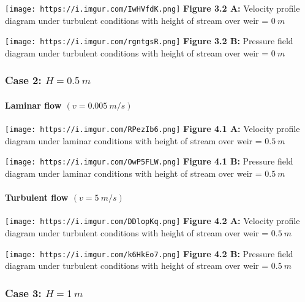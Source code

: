 \documentclass[11pt]{article}
\begin{document}
\texttt{[image: https://i.imgur.com/IwHVfdK.png]} \textbf{Figure 3.2 A:}
Velocity profile diagram under turbulent conditions with height of
stream over weir = \(0\ m\)

\texttt{[image: https://i.imgur.com/rgntgsR.png]} \textbf{Figure 3.2 B:}
Pressure field diagram under turbulent conditions with height of stream
over weir = \(0\ m\)

\hypertarget{case-2-h-0.5-m-1}{%
\subsubsection{\texorpdfstring{Case 2:
\(H = 0.5\ m\)}{Case 2: H = 0.5\textbackslash{} m}}\label{case-2-h-0.5-m-1}}

\hypertarget{laminar-flow-v-0.005-ms-1}{%
\paragraph{\texorpdfstring{Laminar flow
\((v = 0.005\ m/s)\)}{Laminar flow (v = 0.005\textbackslash{} m/s)}}\label{laminar-flow-v-0.005-ms-1}}

\texttt{[image: https://i.imgur.com/RPezIb6.png]} \textbf{Figure 4.1 A:}
Velocity profile diagram under laminar conditions with height of stream
over weir = \(0.5\ m\)

\texttt{[image: https://i.imgur.com/OwP5FLW.png]} \textbf{Figure 4.1 B:}
Pressure field diagram under laminar conditions with height of stream
over weir = \(0.5\ m\)

\hypertarget{turbulent-flow-v-5-ms-1}{%
\paragraph{\texorpdfstring{Turbulent flow
\((v = 5\ m/s)\)}{Turbulent flow (v = 5\textbackslash{} m/s)}}\label{turbulent-flow-v-5-ms-1}}

\texttt{[image: https://i.imgur.com/DDlopKq.png]} \textbf{Figure 4.2 A:}
Velocity profile diagram under turbulent conditions with height of
stream over weir = \(0.5\ m\)

\texttt{[image: https://i.imgur.com/k6HkEo7.png]} \textbf{Figure 4.2 B:}
Pressure field diagram under turbulent conditions with height of stream
over weir = \(0.5\ m\)

\hypertarget{case-3-h-1-m-1}{%
\subsubsection{\texorpdfstring{Case 3:
\(H = 1\ m\)}{Case 3: H = 1\textbackslash{} m}}\label{case-3-h-1-m-1}}
\end{document}
